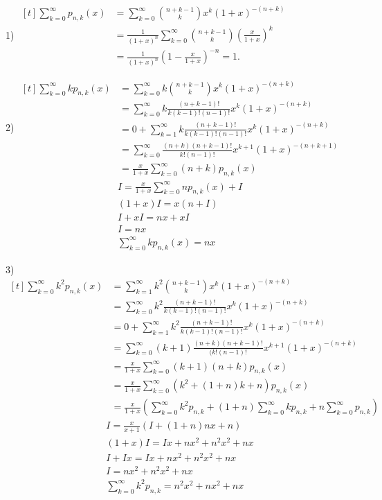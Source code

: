 \begin{english}
1)	$\begin{aligned}[t]
		\sum_{k=0}^{\infty} p_{n,k}(x) &= \sum_{k=0}^{\infty} \binom{n+k-1}{k} x^k (1+x)^{-(n+k)} \\
		&= \frac{1}{(1+x)^n} \sum_{k=0}^{\infty} \binom{n+k-1}{k} \left( \frac{x}{1+x} \right)^k \\
		&= \frac{1}{(1+x)^n} \left( 1 - \frac{x}{1+x} \right)^{-n} = 1.
	\end{aligned}$
\end{english}
	\newpage
\begin{english}
2)	$\begin{aligned}[t]
		\sum_{k=0}^{\infty} k p_{n,k}(x) &= \sum_{k=0}^{\infty} k \binom{n+k-1}{k} x^k (1+x)^{-(n+k)} \\
		&= \sum_{k=0}^{\infty} k \frac{(n+k-1)!}{k(k-1)!(n-1)!} x^k (1+x)^{-(n+k)} \\
		&= 0 + \sum_{k=1}^{\infty} k \frac{(n+k-1)!}{k(k-1)!(n-1)!} x^k (1+x)^{-(n+k)} \\
		&= \sum_{k=0}^{\infty} \frac{(n+k)(n+k-1)!}{k!(n-1)!} x^{k+1} (1+x)^{-(n+k+1)} \\
		&= \frac{x}{1+x} \sum_{k=0}^{\infty} (n+k) p_{n,k}(x)
	\end{aligned}$
\begin{gather*}
	I = \frac{x}{1+x} \sum_{k=0}^{\infty} n p_{n,k}(x) + I\\
	(1+x) I = x(n+I)\\
	I + xI = nx + xI\\
	I = nx\\
	\sum_{k=0}^{\infty} k p_{n,k}(x) = nx
\end{gather*}
\end{english}
\newpage
\begin{english}
	3) $ 
	\begin{aligned}[t]
		\sum_{k=0}^{\infty} k^2 p_{n,k}(x) &= \sum_{k=1}^{\infty} k^2 \binom{n+k-1}{k} x^k (1+x)^{-(n+k)} \\
		&= \sum_{k=0}^{\infty} k^2 \frac{(n+k-1)!}{k(k-1)!(n-1)!} x^k (1+x)^{-(n+k)} \\
		&= 0 + \sum_{k=1}^{\infty} k^2 \frac{(n+k-1)!}{k(k-1)!(n-1)!} x^k (1+x)^{-(n+k)} \\
		&= \sum_{k=0}^{\infty} (k+1) \frac{(n+k)(n+k-1)!}{(k!(n-1)!} x^{k+1} (1+x)^{-(n+k)} \\
		&= \frac{x}{1+x} \sum_{k=0}^{\infty} (k+1)(n+k) p_{n,k}(x)\\
		&= \frac{x}{1+x} \sum_{k=0}^{\infty} (k^2 + (1+n)k + n)p_{n,k}(x)\\
		&= \frac{x}{1+x} \left(
		\sum_{k=0}^{\infty} k^2 p_{n,k} 
		+ (1+n)\sum_{k=0}^{\infty} k p_{n,k} 
		+n\sum_{k=0}^{\infty} p_{n,k} 
		\right)
	\end{aligned}
	$
	\begin{gather*}
		I = \frac{x}{x+1} (I + (1+n)nx + n)\\
		(1+x) I = Ix + nx^2 + n^2x^2 + nx\\
		I + I x = Ix + nx^2 + n^2x^2 + nx\\
		I = nx^2 + n^2x^2 + nx\\
		\sum_{k=0}^{\infty}k^2 p_{n,k} = n^2 x^2 + nx^2 + nx
	\end{gather*}
\end{english}
